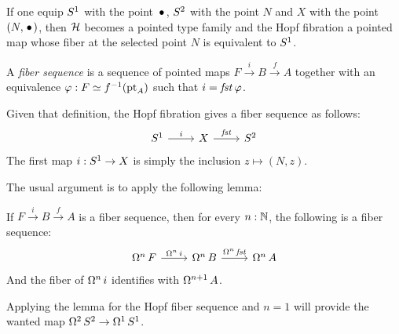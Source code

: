 \documentclass[english,a4]{article}
\begin{document}
If one equip ${S^1}$ with the point $\base$, ${S^2}$ with the point $N$
and $X$ with the point $(N,\base)$, then $\mathcal H$ becomes a pointed
type family and the Hopf fibration a pointed map whose fiber at the
selected point $N$ is equivalent to ${S^1}$.
\begin{definition}
  A {\em fiber sequence} is a sequence of pointed maps
  $F \overset i \to B \overset f \to A$ together with an equivalence
  $\varphi : F \simeq {f}^{-1}({\mathord{\mathrm{pt}}}_A)$ such that $i = \mathop{\mathit{fst}} \varphi$.
\end{definition}
Given that definition, the Hopf fibration gives a fiber sequence as
follows:
\begin{equation}
  \label{eq:9}
  \begin{tikzcd}
    \Sc \rar["i"] & X \rar["\fst"] & \Sp
  \end{tikzcd}
\end{equation}
The first map $i:{S^1} \to X$ is simply the inclusion $z\mapsto
(N,z)$.

The usual argument is to apply the following lemma:
\begin{lemma}
  \label{lemma:fiber-seq-omega}%
  If $F\overset i \to B \overset f \to A$ is a fiber sequence, then
  for every $n:\mathbb{N}$, the following is a fiber sequence:
  \begin{equation}
    \label{eq:20}
    \begin{tikzcd}
      \loopspace n F \rar["\loopspace n i"] & \loopspace n B
      \rar["\loopspace n \fst"] & \loopspace n A
    \end{tikzcd}    
  \end{equation}
  And the fiber of $\mathop{\Omega^{n}} i$ identifies with
  $\mathop{\Omega^{n+1}} A$.
\end{lemma}
Applying the lemma for the Hopf fiber sequence and $n=1$ will provide
the wanted map $\mathop{\Omega^{2}} {S^2} \to \mathop{\Omega^{1}} {S^1}$.
\end{document}
